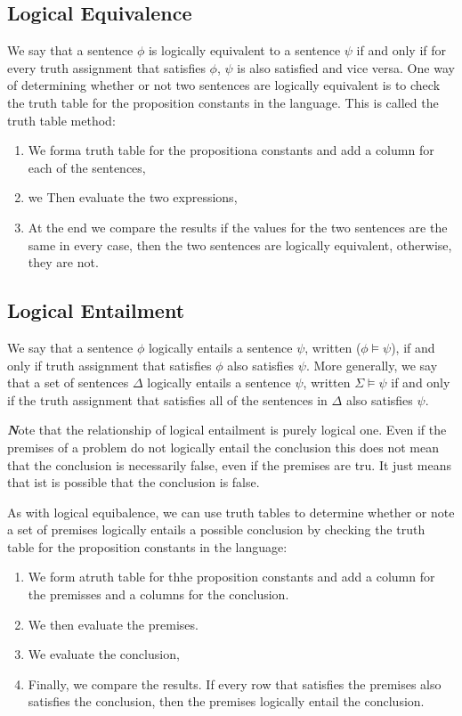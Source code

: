 \documentclass[10pt,a4pape,twocolumn]{article}
\newenvironment{callout}
	{\begin{calloutbox}\color{charcoal}\textbf\textit}
	{\end{calloutbox}}
\begin{document}
            \subsection{Logical Equivalence}
                We say that a sentence $\phi$ is logically equivalent to a sentence $\psi$ if and only if for every truth assignment that satisfies $\phi$, $\psi$ is also satisfied and vice versa. One way of determining whether or not two sentences are logically equivalent is to check the truth table for the proposition constants in the language. This is called the truth table method:
                \begin{enumerate}
                    \item We forma  truth table for the propositiona constants and add a column for each of the sentences,
                    \item we Then evaluate the two expressions,
                    \item At the end we compare the results if the values for the two sentences are the same in every case, then the two sentences are logically equivalent, otherwise, they are not.
                \end{enumerate}
            \subsection{Logical Entailment}
                We say that a sentence $\phi$ logically entails a sentence $\psi$, written ($\phi \vDash \psi$), if and only if truth assignment that satisfies $\phi$ also satisfies $\psi$. More generally, we say that a set of sentences $\Delta$ logically entails a sentence $\psi$, written $\Sigma\vDash\psi$ if and only if the truth assignment that satisfies all of the sentences in $\Delta$ also satisfies $\psi$.
                \begin{callout}
                    Note that the relationship of logical entailment is purely logical one. Even if the premises of a problem do not logically entail the conclusion this does not mean that the conclusion is necessarily false, even if the premises are tru. It just means that ist is possible that the conclusion is false.
                \end{callout}
                As with logical equibalence, we can use truth tables to determine whether or note a set of premises logically entails a possible conclusion by checking the truth table for the proposition constants in the language:
                \begin{enumerate}
                    \item We form atruth table for thhe proposition constants and add a column for the premisses and a columns for the conclusion. 
                    \item We then evaluate the premises. 
                    \item We evaluate the conclusion,
                    \item Finally, we compare the results. If every row that satisfies the premises also satisfies the conclusion, then the premises logically entail the conclusion. 
                \end{enumerate}
\end{document}
